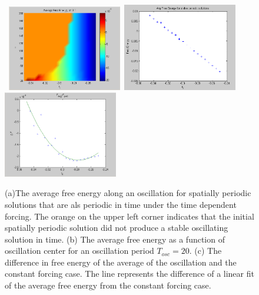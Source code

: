 \documentclass[pre,preprint,superscriptaddress]{revtex4-1}
\begin{document}
\begin{figure}[!htb]
\begin{center}
    \mbox{
\includegraphics[width=50mm]{FEosc1.png}
\includegraphics[width=50mm]{FEosc2.png}
\includegraphics[width=50mm]{FEosc3.png}
}
\caption{(a)The average free energy along an oscillation for spatially periodic solutions that are als periodic in time under the time dependent forcing. The orange on the upper left corner indicates that the initial spatially periodic solution did not produce a stable oscillating solution in time. (b) The average free energy as a function of oscillation center for an oscillation period $T_{osc}=20$.  (c) The difference in free energy of the average of the oscillation and the constant forcing case.  The line represents the difference of a linear fit of the average free energy from the constant forcing case.   }
    \label{fig:FEosc}
\end{center}
\end{figure}
\end{document}
